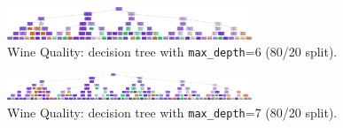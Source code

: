 \begin{figure}[H]
	\centering
	\includegraphics[width=0.65\textwidth]{imgs/dt-mini/dt__wine_quality__80_vs_20__6.png}
	\caption{Wine Quality: decision tree with \texttt{max\_depth}=6 (80/20 split).}\label{fig:wq-dt-depth-6}
\end{figure}

\begin{figure}[H]
	\centering
	\includegraphics[width=0.65\textwidth]{imgs/dt-mini/dt__wine_quality__80_vs_20__7.png}
	\caption{Wine Quality: decision tree with \texttt{max\_depth}=7 (80/20 split).}\label{fig:wq-dt-depth-7}
\end{figure}


